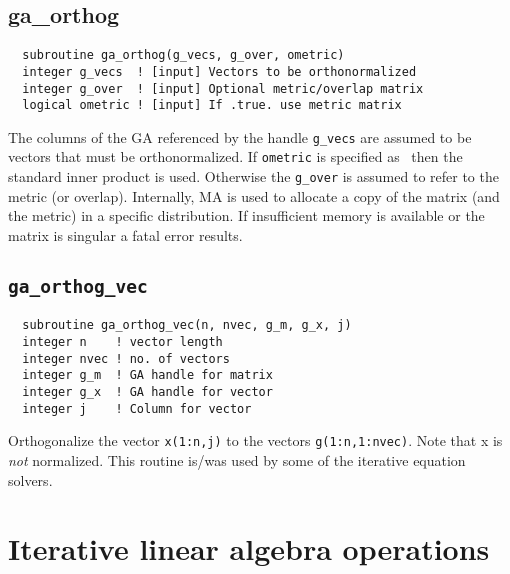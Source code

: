 \subsection{{ga\_orthog}}
\begin{verbatim}
  subroutine ga_orthog(g_vecs, g_over, ometric)
  integer g_vecs  ! [input] Vectors to be orthonormalized
  integer g_over  ! [input] Optional metric/overlap matrix
  logical ometric ! [input] If .true. use metric matrix
\end{verbatim}
The columns of the GA referenced by the handle \verb+g_vecs+ are
assumed to be vectors that must be orthonormalized.  If \verb+ometric+
is specified as \FALSE\ then the standard inner product is used.
Otherwise the \verb+g_over+ is assumed to refer to the metric (or
overlap).  Internally, MA is used to allocate a copy of the matrix
(and the metric) in a specific distribution.  If insufficient memory
is available or the matrix is singular a fatal error results.

\subsection{{\tt ga\_orthog\_vec}}
\begin{verbatim}
  subroutine ga_orthog_vec(n, nvec, g_m, g_x, j) 
  integer n    ! vector length 
  integer nvec ! no. of vectors 
  integer g_m  ! GA handle for matrix 
  integer g_x  ! GA handle for vector 
  integer j    ! Column for vector
\end{verbatim}
Orthogonalize the vector \verb+x(1:n,j)+ to the vectors
\verb+g(1:n,1:nvec)+.  Note that x is {\em not} normalized.  This routine
is/was used by some of the iterative equation solvers.

\section{Iterative linear algebra operations}

